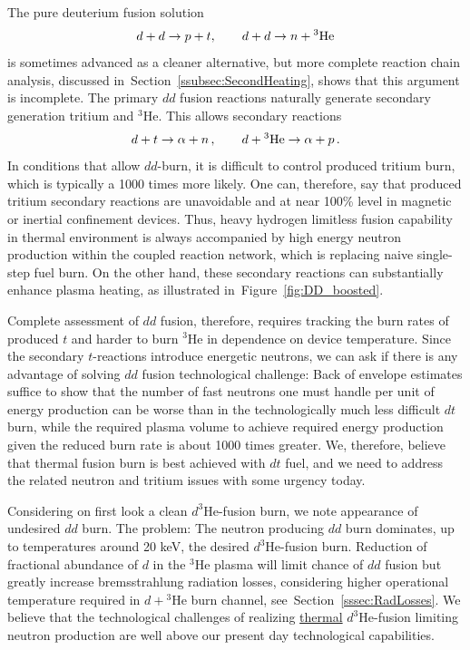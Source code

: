 \documentclass[particles,article,accept,pdftex,moreauthors]{Definitions/mdpi}
\begin{document}
The pure deuterium fusion solution
\begin{align}
d+d\to p+t,\qquad d+d\to n+{}^3{\rm He}
\end{align}
is sometimes advanced as a cleaner alternative, but more complete reaction chain analysis, discussed in~Section~\ref{ssubsec:SecondHeating}, shows that this argument is incomplete. The primary $dd$ fusion reactions naturally generate secondary generation tritium and ${}^3\mathrm{He}$. This allows secondary reactions
\begin{align}
 d+t\to \alpha+n\,,\qquad
 d+{}^3{\rm He}\to \alpha+p\,.
\end{align}
In conditions that allow $dd$-burn, it is difficult to control produced tritium burn, which is typically a 1000 times more likely. One can, therefore, say that produced tritium secondary reactions are unavoidable and at near 100\% level in magnetic or inertial confinement devices. Thus, heavy hydrogen limitless fusion capability in thermal environment is always accompanied by high energy neutron production within the coupled reaction network, which is replacing naive single-step fuel burn. On the other hand, these secondary reactions can substantially enhance plasma heating, as illustrated in~Figure~\ref{fig:DD_boosted}.

Complete assessment of $dd$ fusion, therefore, requires tracking the burn rates of produced $t$ and harder to burn ${}^3\mathrm{He}$ in dependence on device temperature. Since the secondary $t$-reactions introduce energetic neutrons, we can ask if there is any advantage of solving $dd$ fusion technological challenge: Back of envelope estimates suffice to show that the number of fast neutrons one must handle per unit of energy production can be worse than in the technologically much less difficult $dt$ burn, while the required plasma volume to achieve required energy production given the reduced burn rate is about 1000 times greater. We, therefore, believe that thermal fusion burn is best achieved with $dt$ fuel, and we need to address the related neutron and tritium issues with some urgency today.
 
Considering on first look a clean ${d}^{3\!}\mathrm{He}$-fusion burn, we note appearance of undesired $dd$ burn. The problem: The neutron producing $dd$ burn dominates, up to temperatures around 20 keV, the desired ${d}^{3\!}\mathrm{He}$-fusion burn. Reduction of fractional abundance of $d$ in the ${}^3\mathrm{He}$ plasma will limit chance of $dd$ fusion but greatly increase bremsstrahlung radiation losses, considering higher operational temperature required in $d+{}^3\mathrm{He}$ burn channel, see~Section~\ref{sssec:RadLosses}. We believe that the technological challenges of realizing \underline{thermal} ${d}^{3\!}\mathrm{He}$-fusion limiting neutron production are well above our present day technological capabilities. 
\end{document}
